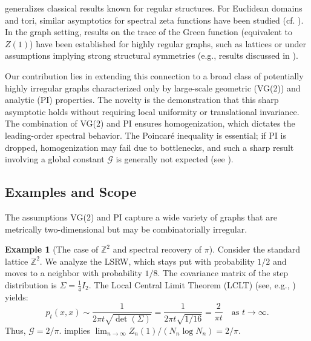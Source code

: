 \documentclass[12pt]{amsart}
\theoremstyle{definition}
\newtheorem{example}[theorem]{Example}
\theoremstyle{remark}
\newcommand{\cG}{\mathcal{G}}    %
\begin{document}
 generalizes classical results known for regular structures. For Euclidean domains and tori, similar asymptotics for spectral zeta functions have been studied (cf. \cite{Colin85, Frank10}). In the graph setting, results on the trace of the Green function (equivalent to $Z(1)$) have been established for highly regular graphs, such as lattices or under assumptions implying strong structural symmetries (e.g., results discussed in \cite{MizunoTachikawa03, Kaimanovich00}).

Our contribution lies in extending this connection to a broad class of potentially highly irregular graphs characterized only by large-scale geometric (VG(2)) and analytic (PI) properties. The novelty is the demonstration that this sharp asymptotic holds without requiring local uniformity or translational invariance. The combination of VG(2) and PI ensures homogenization, which dictates the leading-order spectral behavior. The Poincaré inequality is essential; if PI is dropped, homogenization may fail due to bottlenecks, and such a sharp result involving a global constant $\cG$ is generally not expected (see ).

\subsection{Examples and Scope}
The assumptions VG(2) and PI capture a wide variety of graphs that are metrically two-dimensional but may be combinatorially irregular.

\begin{example}[The case of $\mathbb{Z}^2$ and spectral recovery of $\pi$]\label{rem:pi2}
Consider the standard lattice $\mathbb{Z}^2$. We analyze the LSRW, which stays put with probability $1/2$ and moves to a neighbor with probability $1/8$. The covariance matrix of the step distribution is $\Sigma = \frac{1}{4} I_2$. The Local Central Limit Theorem (LCLT) (see, e.g., \cite[Ch. 2]{LawlerLimic10}) yields:
\[
p_t(x,x) \sim \frac{1}{2\pi t \sqrt{\det(\Sigma)}} = \frac{1}{2\pi t \sqrt{1/16}} = \frac{2}{\pi t} \quad \text{as } t \to \infty.
\]
Thus, $\cG = 2/\pi$.  implies $\lim_{n \to \infty} Z_n(1) / (N_n \log N_n) = 2/\pi$.
\end{example}
\end{document}
